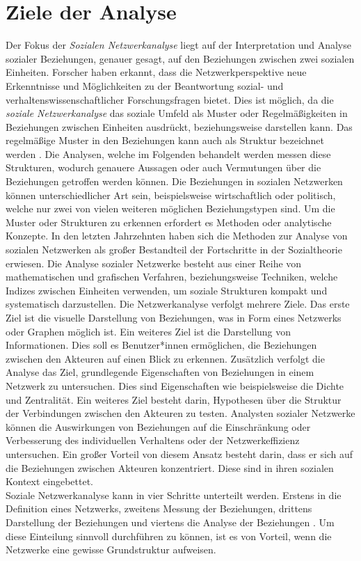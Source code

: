 \section{Ziele der Analyse}
Der Fokus der \textit{Sozialen Netzwerkanalyse} liegt auf der Interpretation und Analyse sozialer Beziehungen, genauer gesagt, auf den Beziehungen zwischen zwei sozialen Einheiten. Forscher haben erkannt, dass die Netzwerkperspektive neue Erkenntnisse und Möglichkeiten zu der Beantwortung sozial- und verhaltenswissenschaftlicher Forschungsfragen bietet. Dies ist möglich, da die \textit{soziale Netzwerkanalyse} das soziale Umfeld als Muster oder Regelmäßigkeiten in Beziehungen zwischen Einheiten ausdrückt, beziehungsweise darstellen kann. Das regelmäßige Muster in den Beziehungen kann auch als Struktur bezeichnet werden \cite{wasserman1994social}. Die Analysen, welche im Folgenden behandelt werden messen diese Strukturen, wodurch genauere Aussagen oder auch Vermutungen über die Beziehungen getroffen werden können. Die Beziehungen in sozialen Netzwerken können unterschiedlicher Art sein, beispielsweise wirtschaftlich oder politisch, welche nur zwei von vielen weiteren möglichen Beziehungstypen sind. Um die Muster oder Strukturen zu erkennen erfordert es Methoden oder analytische Konzepte. In den letzten Jahrzehnten haben sich die Methoden zur Analyse von sozialen Netzwerken als großer Bestandteil der Fortschritte in der Sozialtheorie erwiesen.
Die Analyse sozialer Netzwerke besteht aus einer Reihe von mathematischen und grafischen Verfahren, beziehungsweise Techniken, welche Indizes zwischen Einheiten verwenden, um soziale Strukturen kompakt und systematisch darzustellen.
Die Netzwerkanalyse verfolgt mehrere Ziele. Das erste Ziel ist die visuelle Darstellung von Beziehungen, was in Form eines Netzwerks oder Graphen möglich ist. Ein weiteres Ziel ist die Darstellung von Informationen. Dies soll es Benutzer*innen ermöglichen, die Beziehungen zwischen den Akteuren auf einen Blick zu erkennen. Zusätzlich verfolgt die Analyse das Ziel, grundlegende Eigenschaften von Beziehungen in einem Netzwerk zu untersuchen. Dies sind Eigenschaften wie beispielsweise die Dichte und Zentralität. Ein weiteres Ziel besteht darin, Hypothesen über die Struktur der Verbindungen zwischen den Akteuren zu testen. Analysten sozialer Netzwerke können die Auswirkungen von Beziehungen auf die Einschränkung oder Verbesserung des individuellen Verhaltens oder der Netzwerkeffizienz untersuchen. Ein großer Vorteil von diesem Ansatz besteht darin, dass er sich auf die Beziehungen zwischen Akteuren konzentriert. Diese sind in ihren sozialen Kontext eingebettet.\\
Soziale Netzwerkanalyse kann in vier Schritte unterteilt werden. Erstens in die Definition eines Netzwerks, zweitens Messung der Beziehungen, drittens Darstellung der Beziehungen und viertens die Analyse der Beziehungen \cite{wasserman1994social}. Um diese Einteilung sinnvoll durchführen zu können, ist es von Vorteil, wenn die Netzwerke eine gewisse Grundstruktur aufweisen.

